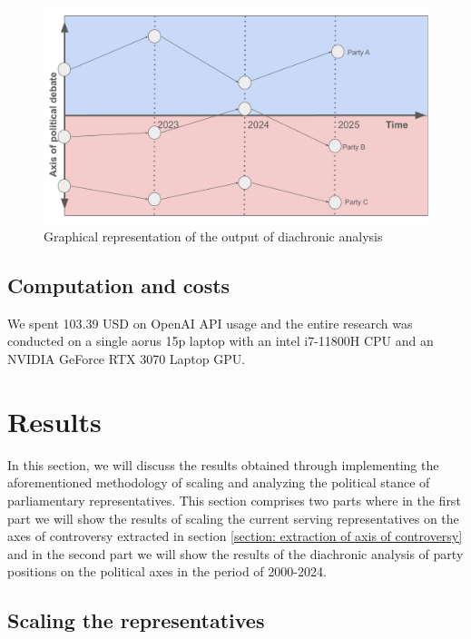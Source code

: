 \documentclass[final,5p,times,twocolumn,authoryear]{elsarticle}
\begin{document}
\begin{figure}[h]
	\centering
	  \centering
	  \includegraphics[width=1\linewidth]{figs/diachronic vis.pdf}
	  \caption{Graphical representation of the output of diachronic analysis}
	  \label{fig:diachronic}
\end{figure}

\subsection{Computation and costs}
We spent 103.39 USD on OpenAI API usage and the entire research was conducted on a single aorus 15p laptop with an intel i7-11800H CPU and an NVIDIA GeForce RTX 3070 Laptop GPU. 

\FloatBarrier

\section{Results}
\label{section:results}
In this section, we will discuss the results obtained through implementing the aforementioned methodology of scaling and analyzing the political stance of parliamentary representatives. This section comprises two parts where in the first part we will show the results of scaling the current serving representatives on the axes of controversy extracted in section \ref{section: extraction of axis of controversy} and in the second part we will show the results of the diachronic analysis of party positions on the political axes in the period of 2000-2024.

\subsection{Scaling the representatives}
\end{document}
